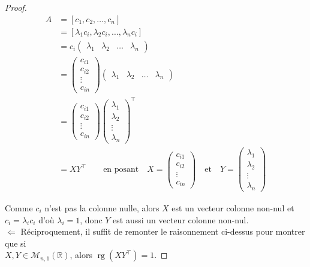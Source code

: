 \documentclass[a4paper]{article}
\begin{document}
\begin{proof}
    \begin{align*}
        A &= [c_1, c_2, \dots , c_n]\\
        &= [\lambda_1 c_i, \lambda_2 c_i, \dots , \lambda_n c_i]\\
        &= c_i \begin{pmatrix}\lambda_1 & \lambda_2 & \dots & \lambda_n \end{pmatrix}\\
        &= \begin{pmatrix}c_{i1} \\ c_{i2} \\ \vdots \\ c_{in} \end{pmatrix} \begin{pmatrix}\lambda_1 & \lambda_2 & \dots & \lambda_n \end{pmatrix}\\
        &= \begin{pmatrix}c_{i1} \\ c_{i2} \\ \vdots \\ c_{in} \end{pmatrix} \begin{pmatrix}\lambda_1 \\ \lambda_2 \\ \vdots \\ \lambda_n \end{pmatrix}^\top\\
        &= XY^\top \qquad \text{en posant}   \quad X = \begin{pmatrix}c_{i1} \\ c_{i2} \\ \vdots \\ c_{in} \end{pmatrix} \quad \text{et} \quad Y = \begin{pmatrix}\lambda_1 \\ \lambda_2 \\ \vdots \\ \lambda_n \end{pmatrix}
    \end{align*}
    
    Comme $c_i$ n'est pas la colonne nulle, alors $X$ est un vecteur colonne non-nul et $c_i = \lambda_i c_i$ d'où $\lambda_i = 1$, donc $Y$ est aussi un vecteur colonne non-nul.\\
    
    $\boxed{\Leftarrow}$ Réciproquement, il suffit de remonter le raisonnement ci-dessus pour montrer que si \\ $X, Y \in \mathcal{M}_{n, 1}(\mathbb{R})$, alors $\operatorname{rg}\left(XY^\top\right)=1$.
    
\end{proof}
\end{document}

